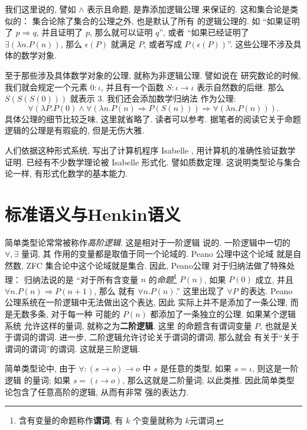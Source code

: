 \documentclass[UTF8]{ctexbook}
\theoremstyle{plain}
\theoremstyle{definition}
\theoremstyle{remark}
\begin{document}
我们这里说的, 譬如 \(\wedge\) 表示且命题, 是靠添加逻辑公理
来保证的. 这和集合论是类似的： 集合论除了集合的公理之外,
也是默认了所有
的逻辑公理的. 如 “如果证明了 \(p \Rightarrow q\), 并且证明了
\(p\), 那么就可以证明 \(q\)”, 或者 “如果已经证明了 \(\exists
(\lambda n. P(n))\), 那么 \(\epsilon(P)\) 就满足 \(P\),
或者写成 \(P(\epsilon(P))\)”.
这些公理不涉及具体的数学对象.

至于那些涉及具体数学对象的公理, 就称为非逻辑公理. 譬如说在
研究数论的时候, 我们就会规定一个元素 \(0 : \iota\),
并且有一个函数 \(S : \iota \to \iota\) 表示自然数的后继.
那么 \(S(S(S(0)))\) 就表示 \(3\). 我们还会添加数学归纳法
作为公理:
\[\forall (\lambda P. P(0) \wedge
\forall(\lambda n. P(n)\Rightarrow P(S(n)))
\Rightarrow \forall (\lambda n. P(n))).\]
具体公理的细节比较乏味, 这里就省略了. 读者可以参考\cite{farmer:2008:virtues}.
据笔者的阅读它关于命题逻辑的公理是有瑕疵的, 但是无伤大雅.

人们依据这种形式系统, 写出了计算机程序 Isabelle \cite{tobias:2002:isabelle},
用计算机的准确性验证数学证明. 已经有不少数学理论被 Isabelle 形式化.
譬如质数定理\cite{eberl:2018:pnt}. 这说明类型论与集合论一样,
有形式化数学的基本能力.

\section{标准语义与Henkin语义}
简单类型论常常被称作\emph{高阶逻辑}. 这是相对于一阶逻辑
说的. 一阶逻辑中一切的 \(\forall, \exists\) 量词, 其
作用的变量都是取值于同一个论域的. Peano 公理中这个论域
就是自然数, ZFC 集合论中这个论域就是集合. 因此, Peano公理
对于归纳法做了特殊处理： 归纳法说的是 “对于所有含变量
\(n\) 的\emph{命题}\footnote{含有变量的命题称作\textbf{谓词},
有 \(k\) 个变量就称为 \(k\)元谓词.}
\(P(n)\), 如果 \(P(0)\) 成立,
并且 \(\forall n. P(n) \Rightarrow P(n+1)\), 那么
就有 \(\forall n. P(n)\).” 这里出现了 \(\forall P\)
的表达. Peano 公理系统在一阶逻辑中无法做出这个表达, 因此
实际上并不是添加了一条公理, 而是无数多条, 对于每一种
可能的 \(P(n)\) 都添加了一条独立的公理. 如果某个逻辑系统
允许这样的量词, 就称之为\textbf{二阶逻辑}. 这里
的命题含有谓词变量 \(P\), 也就是关于谓词的谓词.
进一步, 二阶逻辑允许讨论关于谓词的谓词, 那么就会
有关于“关于谓词的谓词”的谓词. 这就是三阶逻辑.

简单类型论中, 由于 \(\forall : (s \to o) \to o\) 中
\(s\) 是任意的类型, 如果 \(s = \iota\), 则这是一阶逻辑
的量词; 如果 \(s = (\iota \to o)\), 那么这就是二阶量词;
以此类推. 因此简单类型论包含了任意高阶的逻辑, 从而有非常
强的表达力.
\end{document}
